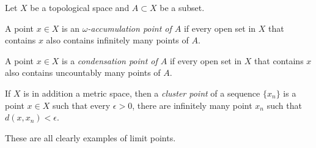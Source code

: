\documentclass[12pt]{article}
\newcommand{\<}{\langle}
\renewcommand{\>}{\rangle}
\begin{document}
Let $X$ be a topological space and $A\subset X$ be a subset.

A point $x\in X$ is an \emph{$\omega$-accumulation point of $A$} if every open set in $X$ that contains $x$ also contains infinitely many points of $A$.

A point $x\in X$ is a \emph{condensation point of $A$} if every open set in $X$ that contains $x$ also contains uncountably many points of $A$.

If $X$ is in addition a metric space, then a \emph{cluster point} of a sequence $\{x_n\}$ is a point $x\in X$ such that every $\epsilon>0$, there are infinitely many point $x_n$ such that $d(x,x_n)<\epsilon$.

These are all clearly examples of limit points.
\end{document}
